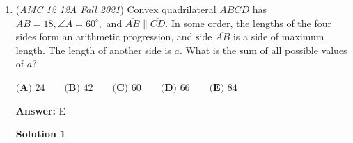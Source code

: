 \begin{enumerate}
 \[0=x^2-\left(2\alpha +\frac{u^2\sin(2\theta)}{g}\right)x+\alpha^2+\frac{\alpha u^2\sin(2\theta)}{g}-\alpha=x^2-2hx+h^2.\]Comparing linear coefficients instantly yields 
 \[h=\alpha+\frac{u^2\sin(2\theta)}{2g}.\]Comparing our constant term and using our expression for $h$ yields
 \[h^2=\alpha^2+\frac{u^2\sin(2\theta)}{g}+\frac{u^4\sin^2(2\theta)}{4g^2}=\alpha^2+\frac{u^2\sin(2\theta)}{g}-\alpha\implies -4\alpha=\frac{u^2\sin^2(2\theta)}{g^2}\implies 2\sqrt{-\alpha} =\frac{u\sin(2\theta)}{g}\quad (\alpha\le0).\]Thus to maximize $f$ we can just maximize
 \[f_1(\alpha)=2\alpha+2\sqrt{-\alpha}\qquad (\alpha\le 0)\]We used common derivatives/integrals for the projectile motion but we're not doing that here for no reason
 \[\frac{\mathrm{d} f}{\mathrm{d} \alpha}=\lim_{h\to 0}\frac{2(\alpha+h)+2\sqrt{-\alpha -h}-2\alpha -2\sqrt{-a} }{h}=2+2\lim_{h\to 0}\frac{\sqrt{-\alpha-h}-\sqrt{-\alpha}}{h}=2+2\lim_{h\to 0}\frac{-h}{h(\sqrt{-\alpha-h}+\sqrt{-\alpha})}=2-\frac{1}{\sqrt {-\alpha}}.\]So
 \[\frac{\mathrm{d} f}{\mathrm{d} \alpha}=0\implies \frac{1}{\sqrt{-\alpha}}=2\implies \sqrt{-\alpha}=\frac12\implies \alpha=-\frac14.\]We then have that $\max(f)=\alpha+\beta=-\frac12+1=\frac12$ so $\beta =\frac34.$ Thus
 \[\tilde p(x)=\left(x+\frac14\right)\left(x-\frac34\right)\implies\tilde p(1)=\frac54\cdot \frac14=\boxed{\textbf{(A) }\frac5{16}}\]~shockfront99

 


	\item (\textit{AMC 12 12A Fall 2021}) Convex quadrilateral $ABCD$ has $AB = 18, \angle{A} = 60^\circ,$ and $\overline{AB} \parallel \overline{CD}.$ In some order, the lengths of the four sides form an arithmetic progression, and side $\overline{AB}$ is a side of maximum length. The length of another side is $a.$ What is the sum of all possible values of $a$?


 $\textbf{(A) } 24 \qquad \textbf{(B) } 42 \qquad \textbf{(C) } 60 \qquad \textbf{(D) } 66 \qquad \textbf{(E) } 84$

 \textbf{Answer: }E



\textbf{Solution 1}


\end{enumerate}
